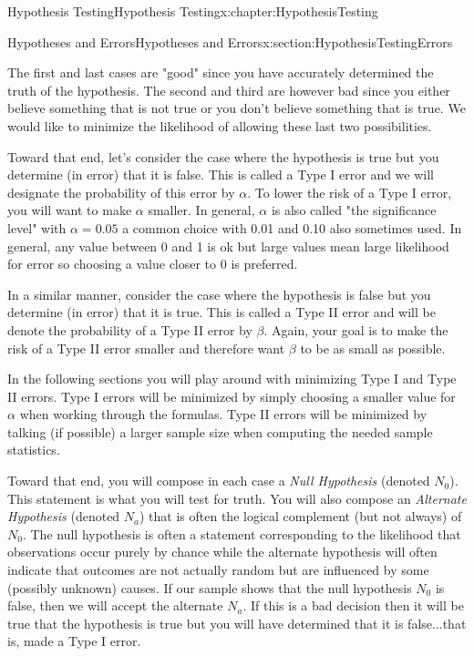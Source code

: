 \documentclass[oneside,10pt,]{book}
\numberwithin{equation}{section}
\begin{document}
\begin{chapterptx}{Hypothesis Testing}{}{Hypothesis Testing}{}{}{x:chapter:HypothesisTesting}
\begin{sectionptx}{Hypotheses and Errors}{}{Hypotheses and Errors}{}{}{x:section:HypothesisTestingErrors}
\begin{itemize}[label=\textbullet]
\end{itemize}
The first and last cases are "good" since you have accurately determined the truth of the hypothesis. The second and third are however bad since you either believe something that is not true or you don't believe something that is true. We would like to minimize the likelihood of allowing these last two possibilities.%
\par
Toward that end, let's consider the case where the hypothesis is true but you determine (in error) that it is false. This is called a Type I error and we will designate the probability of this error by \(\alpha\). To lower the risk of a Type I error, you will want to make \(\alpha\) smaller.  In general, \(\alpha\) is also called "the significance level" with \(\alpha = 0.05\) a common choice with 0.01 and 0.10 also sometimes used. In general, any value between 0 and 1 is ok but large values mean large likelihood for error so choosing a value closer to 0 is preferred.%
\par
In a similar manner, consider the case where the hypothesis is false but you determine (in error) that it is true. This is called a Type II error and will be denote the probability of a Type II error by \(\beta\). Again, your goal is to make the risk of a Type II error smaller and therefore want \(\beta\) to be as small as possible.%
\par
In the following sections you will play around with minimizing Type I and Type II errors. Type I errors will be minimized by simply choosing a smaller value for \(\alpha\) when working through the formulas. Type II errors will be minimized by talking (if possible) a larger sample size when computing the needed sample statistics.%
\par
Toward that end, you will compose in each case a \emph{Null Hypothesis} (denoted \(N_0\)). This statement is what you will test for truth. You will also compose an \emph{Alternate Hypothesis} (denoted \(N_a\)) that is often the logical complement (but not always) of \(N_0\). The null hypothesis is often a statement corresponding to the likelihood that observations occur purely by chance while the alternate hypothesis will often indicate that outcomes are not actually random but are influenced by some (possibly unknown) causes.  If our sample shows that the null hypothesis \(N_0\) is false, then we will accept the alternate \(N_a\). If this is a bad decision then it will be true that the hypothesis is true but you will have determined that it is false...that is, made a Type I error.%
\par

\end{sectionptx}
\end{chapterptx}
\end{document}
